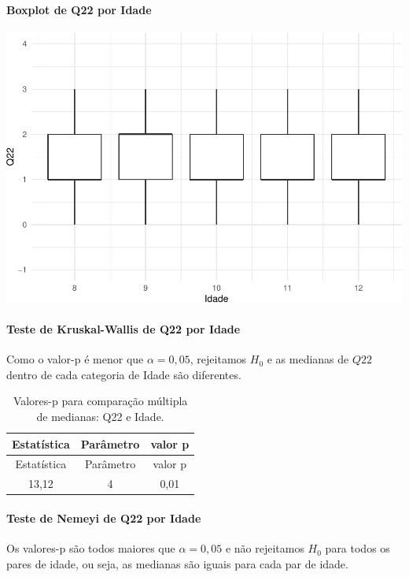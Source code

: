 \documentclass[]{article}
\let\oldparagraph\paragraph
\renewcommand{\paragraph}[1]{\oldparagraph{#1}\mbox{}}
\begin{document}
\hypertarget{boxplot-de-q22-por-idade-1}{%
\paragraph{Boxplot de Q22 por Idade}\label{boxplot-de-q22-por-idade-1}}

\begin{center}\includegraphics[width=0.75\linewidth]{relatorio_files/figure-latex/unnamed-chunk-389-1} \end{center}

\hypertarget{teste-de-kruskal-wallis-de-q22-por-idade-1}{%
\paragraph{Teste de Kruskal-Wallis de Q22 por Idade}\label{teste-de-kruskal-wallis-de-q22-por-idade-1}}

Como o valor-p é menor que \(\alpha=0,05\), rejeitamos \(H_0\) e as medianas de \(Q22\) dentro de cada categoria de Idade são diferentes.

\begin{longtable}[]{@{}ccc@{}}
\caption{\label{tab:unnamed-chunk-390}Valores-p para comparação múltipla de medianas: Q22 e Idade.}\tabularnewline
\toprule
Estatística & Parâmetro & valor p\tabularnewline
\midrule
\endfirsthead
\toprule
Estatística & Parâmetro & valor p\tabularnewline
\midrule
\endhead
13,12 & 4 & 0,01\tabularnewline
\bottomrule
\end{longtable}

\hypertarget{teste-de-nemeyi-de-q22-por-idade-1}{%
\paragraph{Teste de Nemeyi de Q22 por Idade}\label{teste-de-nemeyi-de-q22-por-idade-1}}

Os valores-p são todos maiores que \(\alpha=0,05\) e não rejeitamos \(H_0\) para todos os pares de idade, ou seja, as medianas são iguais para cada par de idade.
\end{document}
